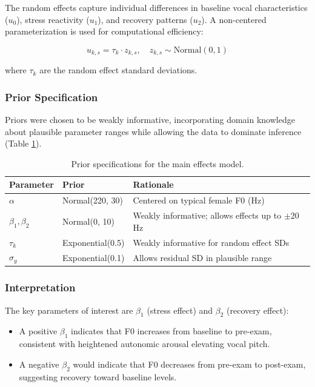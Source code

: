 \documentclass[
  english,
  man,floatsintext]{apa6}
\providecommand{\tightlist}{%
  \setlength{\itemsep}{0pt}\setlength{\parskip}{0pt}}
\begin{document}
The random effects capture individual differences in baseline vocal characteristics (\(u_0\)), stress reactivity (\(u_1\)), and recovery patterns (\(u_2\)). A non-centered parameterization is used for computational efficiency:

\[
u_{k,s} = \tau_k \cdot z_{k,s}, \quad z_{k,s} \sim \text{Normal}(0, 1)
\]

where \(\tau_k\) are the random effect standard deviations.

\subsubsection{Prior Specification}\label{prior-specification}

Priors were chosen to be weakly informative, incorporating domain knowledge about plausible parameter ranges while allowing the data to dominate inference (Table \ref{tab:table-s8-priors-main}).

\begin{table}

\caption{\label{tab:table-s8-priors-main}Prior specifications for the main effects model.}
\centering
\begin{tabular}[t]{lll}
\toprule
Parameter & Prior & Rationale\\
\midrule
$\alpha$ & Normal(220, 30) & Centered on typical female F0 (Hz)\\
$\beta_1, \beta_2$ & Normal(0, 10) & Weakly informative; allows effects up to $\pm$20 Hz\\
$\tau_k$ & Exponential(0.5) & Weakly informative for random effect SDs\\
$\sigma_y$ & Exponential(0.1) & Allows residual SD in plausible range\\
\bottomrule
\end{tabular}
\end{table}

\subsubsection{Interpretation}\label{interpretation}

The key parameters of interest are \(\beta_1\) (stress effect) and \(\beta_2\) (recovery effect):

\begin{itemize}
\tightlist
\item
  A positive \(\beta_1\) indicates that F0 increases from baseline to pre-exam, consistent with heightened autonomic arousal elevating vocal pitch.
\item
  A negative \(\beta_2\) would indicate that F0 decreases from pre-exam to post-exam, suggesting recovery toward baseline levels.
\end{itemize}
\end{document}
